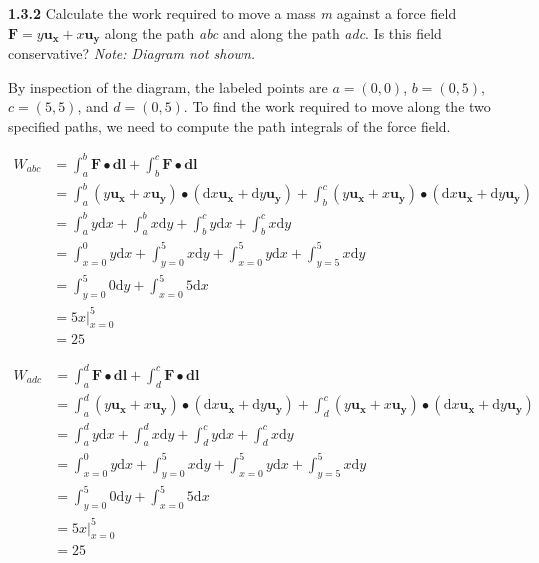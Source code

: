 \documentclass{article}
\begin{document}
\textbf{1.3.2} Calculate the work required to move a mass \textit{m} against a force field $\mathbf{F} = y\mathbf{u_x} +
	x\mathbf{u_y}$ along the path \textit{abc} and along the path \textit{adc}. Is this field conservative?
\textit{Note: Diagram not shown.}

\vspace{24pt}

By inspection of the diagram, the labeled points are $a = (0, 0)$, $b = (0, 5)$, $c = (5, 5)$, and $d = (0, 5)$. To
find the work required to move along the two specified paths, we need to compute the path integrals of the force field.

\begin{equation*}
	\begin{split}
		W_{abc} & = \int_a^b \mathbf{F} \bullet \mathbf{dl} + \int_b^c \mathbf{F} \bullet \mathbf{dl} \\
		& = \int_a^b (y\mathbf{u_x} + x\mathbf{u_y}) \bullet (\text{d}x\mathbf{u_x} + \text{d}y\mathbf{u_y}) + \int_b^c (y\mathbf{u_x} + x\mathbf{u_y}) \bullet (\text{d}x\mathbf{u_x} + \text{d}y\mathbf{u_y}) \\
		& = \int_a^b y\text{d}x + \int_a^b x\text{d}y + \int_b^c y\text{d}x + \int_b^c x\text{d}y \\
		& = \int_{x=0}^0 y\text{d}x + \int_{y=0}^5 x\text{d}y + \int_{x=0}^5 y\text{d}x + \int_{y=5}^5 x\text{d}y \\
		& = \int_{y=0}^5 0\text{d}y + \int_{x=0}^5 5\text{d}x \\
		& = 5x \big\rvert_{x=0}^5 \\
		& = 25
	\end{split}
\end{equation*}

\begin{equation*}
	\begin{split}
		W_{adc} & = \int_a^d \mathbf{F} \bullet \mathbf{dl} + \int_d^c \mathbf{F} \bullet \mathbf{dl} \\
		& = \int_a^d (y\mathbf{u_x} + x\mathbf{u_y}) \bullet (\text{d}x\mathbf{u_x} + \text{d}y\mathbf{u_y}) + \int_d^c (y\mathbf{u_x} + x\mathbf{u_y}) \bullet (\text{d}x\mathbf{u_x} + \text{d}y\mathbf{u_y}) \\
		& = \int_a^d y\text{d}x + \int_a^d x\text{d}y + \int_d^c y\text{d}x + \int_d^c x\text{d}y \\
		& = \int_{x=0}^0 y\text{d}x + \int_{y=0}^5 x\text{d}y + \int_{x=0}^5 y\text{d}x + \int_{y=5}^5 x\text{d}y \\
		& = \int_{y=0}^5 0\text{d}y + \int_{x=0}^5 5\text{d}x \\
		& = 5x \big\rvert_{x=0}^5 \\
		& = 25
	\end{split}
\end{equation*}
\end{document}
